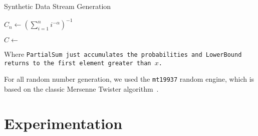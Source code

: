 \documentclass[a4paper, 11pt]{article}
\begin{document}
\begin{algorithm}[H]
    \caption{Synthetic Data Stream Generation}
    \label{algo:SyntheticDataStream}
    \SetAlgoLined
    \BlankLine


    \BlankLine
    $C_n \gets (\sum_{i=1}^{n}{ i^{-\alpha}})^{-1}$\;

    \BlankLine

    \BlankLine
    $C \gets$ \;

    \BlankLine
\end{algorithm}

Where \tt{PartialSum} just accumulates the probabilities and \tt{LowerBound} returns to the first element greater than $x$.


For all random number generation, we used the \texttt{mt19937} random engine, which is based on the classic Mersenne Twister algorithm~\cite{MersenneTwister}. 

\clearpage
\section{Experimentation}
\end{document}
